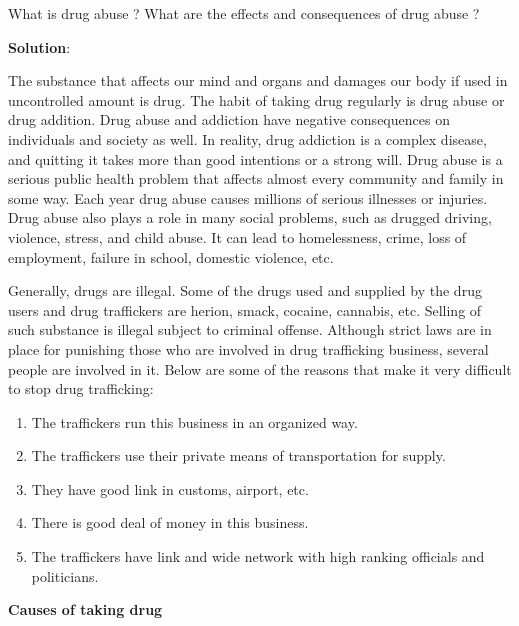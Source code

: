 \documentclass[
  openany]{book}
\newcommand{\question}{\item}
\newenvironment{solution}{ {\bfseries Solution}:}{}
\begin{document}
\begin{questions}
\question What is drug abuse ? What are the effects and consequences of drug abuse ?

\begin{solution}

The substance that affects our mind and organs and damages our body if used in uncontrolled amount is drug. The habit of taking drug regularly is drug abuse or drug addition. Drug abuse and addiction have negative consequences on individuals and society as well. In reality, drug addiction is a complex disease, and quitting it takes more than good intentions or a strong will. Drug abuse is a serious public health problem that affects almost every community and family in some way. Each year drug abuse causes millions of serious illnesses or injuries. Drug abuse also plays a role in many social problems, such as drugged driving, violence, stress, and child abuse. It can lead to homelessness, crime, loss of employment, failure in school, domestic violence, etc.

Generally, drugs are illegal. Some of the drugs used and supplied by the drug users and drug traffickers are herion, smack, cocaine, cannabis, etc. Selling of such substance is illegal subject to criminal offense. Although strict laws are in place for punishing those who are involved in drug trafficking business, several people are involved in it. Below are some of the reasons that make it very difficult to stop drug trafficking:

\begin{enumerate}
\item The traffickers run this business in an organized way.
\item The traffickers use their private means of transportation for supply.
\item They have good link in customs, airport, etc.
\item There is good deal of money in this business.
\item The traffickers have link and wide network with high ranking officials and politicians.
\end{enumerate}

\textbf{Causes of taking drug}


\end{solution}
\end{questions}
\end{document}
